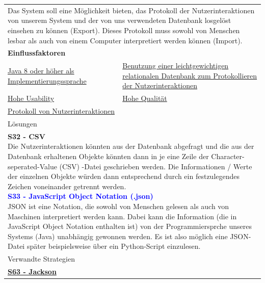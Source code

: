 \documentclass[enabledeprecatedfontcommands,fontsize=11pt,paper=a4,twoside]{scrartcl}
\newcounter{one}
\newcommand{\cb}[1]{{\textcolor{blue}{#1}}}
\begin{document}
\begin{tabular} {|p{8cm} p{8cm}|}
	\hline
	\rowcolor{prob}\multicolumn{2}{|l|}{\parbox{16cm}{\textbf{12: Protokoll der Nutzerinteraktionen exportieren/ importieren}}} \\  \hline\hline 
	\multicolumn{2}{|l|}{\parbox{16cm}{Das System soll eine Möglichkeit bieten, das Protokoll der Nutzerinteraktionen von unserem System und der von uns verwendeten Datenbank losgelöst einsehen zu können (Export). Dieses Protokoll muss sowohl von Menschen lesbar als auch von einem Computer interpretiert werden können (Import).}}\rule{0pt}{7ex}\\ [4ex] \hline
	\multicolumn{2}{|l|}{\textbf{Einflussfaktoren}}\\
	\hyperlink{b}{Java 8 oder höher als Implementierungssprache} &
	\hyperlink {d}{Benutzung einer leichtgewichtigen relationalen Datenbank zum Protokollieren der Nutzerinteraktionen}\\ 
	\hyperlink {g}{Hohe Usability}&
	\hyperlink {h}{Hohe Qualität}\\
	\hyperlink {bb}{Protokoll von Nutzerinteraktionen} &
	\\ \hline
	\multicolumn{2}{|l|}{Lösungen} \\
	\multicolumn{2}{|l|}{\parbox{16cm}{
			\textbf{S32 - CSV} \\
			Die Nutzerinteraktionen könnten aus der Datenbank abgefragt und die aus der Datenbank erhaltenen Objekte könnten dann in je eine Zeile der Character-seperated-Value (CSV) -Datei geschrieben werden. Die Informationen / Werte der einzelnen Objekte würden dann entsprechend durch ein festzulegendes Zeichen voneinander getrennt werden. \\
			\textbf{\cb{\hypertarget{jjj}{S33 - JavaScript Object Notation (.json)}}} \\
			JSON ist eine Notation, die sowohl von Menschen gelesen als auch von Maschinen interpretiert werden kann. Dabei kann die Information (die in JavaScript Object Notation enthalten ist) von der Programmiersprche unseres Systems (Java) unabhängig gewonnen werden. Es ist also möglich eine JSON-Datei später beispielsweise über ein Python-Script einzulesen.
	} }\\ \hline
	\multicolumn{2}{|l|}{Verwandte Strategien} \\
	\textbf{\hyperlink{www}{S63 - Jackson}}&
	\\\hline
\end{tabular}\\ \\ \\
\end{document}
